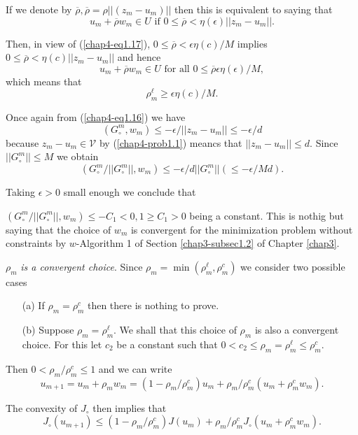 If we denote by $\overline{\rho}, \overline{\rho} = \rho||(z_{m}-u_{m})||$  then this is equivalent to saying that
$$
u_{m} + \overline{\rho}w_{m} \in U \text{ if } 0 \leq \overline{\rho} < \eta(\epsilon) ||z_{m}-u_{m}||.
$$

Then, in view of (\ref{chap4-eq1.17}), $0 \leq \overline{\rho} < \epsilon \eta (c)/ M$ implies $0 \leq \overline{\rho} < \eta(c)|| z_{m}-u_{m}||$ and hence
$$
u_{m} + \overline{\rho}w_{m} \in U \text{ for all } 0 \leq \overline{\rho} \epsilon \eta(\epsilon)/ M,
$$
which means that
$$
\rho_{m}^{\ell} \geq \epsilon \eta(c)/ M.
$$

Once again from (\ref{chap4-eq1.16}) we have
$$
(G_{\circ}^{m}, w_{m}) \leq - \epsilon / ||z_{m}-u_{m}|| \leq - \epsilon/d
$$
because $z_{m}-u_{m} \in \mathscr{V}$ by (\ref{chap4-prob1.1}) meancs that $||z_{m}-u_{m}|| \leq d$. Since $||G_{\circ}^{m}|| \leq M$ we obtain
$$
(G_{\circ}^{m} / ||G_{\circ}^{m}||, w_{m}) \leq -\epsilon / d ||G_{\circ}^{m}|| (\leq - \epsilon / Md).
$$\pageoriginale

Taking $\epsilon > 0$ small enough we conclude that

$(G_{\circ}^{m} / ||G_{\circ}^{m}||, w_{m}) \leq -C_{1} < 0, 1 \geq C_{1} > 0$ being a constant. This is nothig but saying that the choice of $w_{m}$ is convergent for the minimization problem without constraints by $w$-Algorithm 1 of Section \ref{chap3-subsec1.2} of Chapter \ref{chap3}.

$\rho_{m}$ {\em is a convergent choice}. Since $\rho_{m} = \min (\rho_{m}^{\ell}, \rho_{m}^{c})$ we consider two possible cases
\begin{enumerate}
\item[(a)] If $\rho_{m} = \rho_{m}^{c}$ then there is nothing to prove.

\item[(b)] Suppose $\rho_{m} = \rho_{m}^{\ell}$. We shall that this choice of $\rho_{m}$ is also a convergent choice. For this let $c_{2}$ be a constant such that $0 < c_{2} \leq \rho_{m} = \rho_{m}^{\ell} \leq \rho_{m}^{c}$.
\end{enumerate}

Then $0 < \rho_{m} / \rho_{m}^{c} \leq 1$ and we can write
$$
u_{m+1} = u_{m} + \rho_{m} w_{m} = (1-\rho_{m}/\rho_{m}^{c}) u_{m} + \rho_{m} / \rho_{m}^{c} (u_{m} + \rho_{m}^{c} w_{m}).
$$

The convexity of $J_{\circ}$ then implies that
$$
J_{\circ} (u_{m+1}) \leq (1-\rho_{m} / \rho_{m}^{c}) J(u_{m}) + \rho_{m} / \rho_{m}^{c} J_{\circ} (u_{m} + \rho_{m}^{c} w_{m}).
$$

